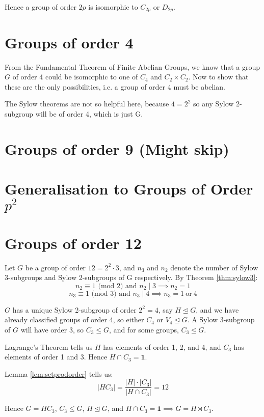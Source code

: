\documentclass[a4paper, oneside, 12pt, final]{article}
\theoremstyle{definition}
\begin{document}
Hence a group of order \(2p\) is isomorphic to \(C_{2p}\) or \(D_{2p}\).

\section{Groups of order 4}
From the Fundamental Theorem of Finite Abelian Groups, we know that a group
\(G\) of order 4 could be isomorphic to one of \(C_4\) and \(C_2 \times C_2\).
Now to show that these are the only possibilities, i.e. a group of order 4 must
be abelian.

The Sylow theorems are not so helpful here, because \(4=2^2\) so any Sylow
2-subgroup will be of order 4, which is just G.

\section{Groups of order 9 (Might skip)}

\section{Generalisation to Groups of Order \(p^2\)}

\section{Groups of order 12}
Let \(G\) be a group of order \(12 = 2^2 \cdot 3\), and \(n_3\) and \(n_2\) denote the number of
Sylow 3-subgroups and Sylow 2-subgroups of G respectively.
By Theorem \ref{thm:sylow3}:
\[n_2 \equiv 1 \text{ (mod 2) and } n_2 \mid 3 \implies n_2 = 1\]
\[n_3 \equiv 1 \text{ (mod 3) and } n_3 \mid 4 \implies n_3 = 1 \ \text{or} \ 4\]

\(G\) has a unique Sylow 2-subgroup of order \(2^2 = 4\), say \(H \unlhd G\),
and we have already classified groups of order 4, so either \(C_4\) or \(V_4
\unlhd G\).
A Sylow 3-subgroup of \(G\) will have order 3, so  \(C_3 \leqslant G\), and for some groups, \(C_3 \unlhd G\).

Lagrange's Theorem tells us \(H\) has elements of order 1, 2, and 4, and \(C_3\) has elements of order 1 and 3.
Hence \(H \cap C_3 = \bm{1}\).

Lemma \ref{lem:setprodorder} tells us:
\[|H C_3| = \frac{|H| \cdot |C_3|}{|H \cap C_3|} = 12\]

Hence \(G = H C_3\), \(C_3 \leqslant G\), \(H \unlhd G\), and \(H \cap C_3 =
\bm{1} \implies G = H \rtimes C_3\).
\end{document}
